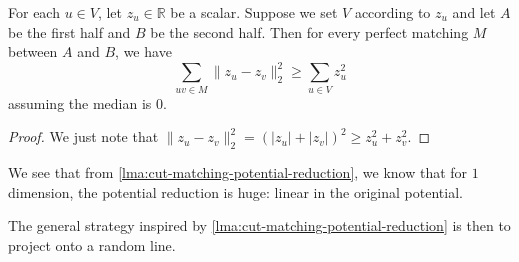 \begin{lemma}\label{lma:cut-matching-potential-reduction}
	For each \(u \in V\), let \(z_u \in \mathbb{R} \) be a scalar. Suppose we set \(V\) according to \(z_u\) and let \(A\) be the first half and \(B\) be the second half. Then for every perfect matching \(M\) between \(A\) and \(B\), we have
	\[
		\sum_{uv \in M} \lVert z_u - z_v \rVert _2^2
		\geq \sum_{u \in V} z_u^2
	\]
	assuming the median is \(0\).
\end{lemma}
\begin{proof}
	We just note that \(\lVert z_u - z_v \rVert _2^2 = (\lvert z_u \rvert + \lvert z_v \rvert )^2 \geq z_u^2 + z_v^2\).
\end{proof}

We see that from \autoref{lma:cut-matching-potential-reduction}, we know that for \(1\) dimension, the potential reduction is huge: linear in the original potential.

\begin{intuition}
	The general strategy inspired by \autoref{lma:cut-matching-potential-reduction} is then to project onto a random line.
\end{intuition}